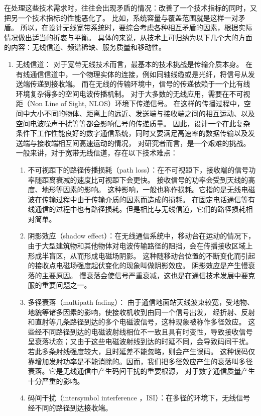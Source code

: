 在处理这些技术需求时，往往会出现矛盾的情况：改善了一个技术指标的同时，又把另一个技术指标的性能恶化了。
比如，系统容量与覆盖范围就是这样一对矛盾。
所以，在设计无线宽带系统时，要综合考虑各种相互矛盾的因素，根据实际情况做出适当的折衷与平衡。
具体的来说，从技术上可归纳为以下几个大的方面的内容：无线信道、频谱稀缺、服务质量和移动性。
\begin{enumerate}[1)]
    \item {无线信道：}
对于宽带无线技术而言，最基本的技术挑战是传输介质本身。
在有线通信信道中，一个物理实体的连接，例如同轴线缆或是光纤，将信号从发送端传递到接收端。
而在无线的传输环境中，信号的传递依赖于一个比有线环境复杂得多的空间电波传播机制。
对于大多数的无线应用，需要在不可视距（Non Line of Sight, NLOS）环境下传递信号。
在这样的传播过程中，空间中大小不同的物体、距离上的远近、发送端与接收端之间的相互运动、以及空间电波噪声干扰等等都会影响信号的传递质量。
因此，设计一个在此复杂条件下工作性能良好的数字通信系统，同时又要满足高速率的数据传输以及发送端与接收端相互间高速运动的情况，
对研究者而言，是一个艰难的挑战。
一般来讲，对于宽带无线信道，存在以下技术难点：
\begin{enumerate}[(1)]
\item 不可视距下的路径传播损耗（path loss）：在不可视距下，接收端的信号功率随距离衰减的速度比可视距下会更快。
接收信号的功率会受到天线的高度、地形等因素的影响。
这种影响，一般也称作损耗。它指的是无线电磁波在传输过程中由于传输介质的因素而造成的损耗。
在固定电话通信等有线通信的过程中也有路径损耗。但是相比与无线信道，它们的路径损耗相对简单。
\item 阴影效应（shadow effect）：在无线通信系统中，移动台在运动的情况下，由于大型建筑物和其他物体对电波传输路径的阻挡，会在传播接收区域上形成半盲区，从而形成电磁场阴影。
这种随移动台位置的不断变化而引起的接收点电磁场强度起伏变化的现象叫做阴影效应。
阴影效应是产生慢衰落的主要原因。
慢衰落会使信号严重衰减，这也是在通信技术发展中要克服的重要问题之一。
\item 多径衰落（multipath fading）： 由于通信地面站天线波束较宽，受地物、地貌等诸多因素的影响，使接收机收到由同一个信号出发，
    经折射、反射和直射等几条路径到达的多个电磁波信号，这种现象被称作多径效应。
这些经不同路径到达的电磁波射线相位不一致且具有时变性，导致接收信号呈衰落状态；又由于这些电磁波射线到达的时延不同，会导致码间干扰。
若此多条射线强度较大，且时延差不能忽略，则会产生误码。
这种误码仅靠增加发射功率是不能消除的。因而，我们把多径效应产生的衰落叫多径衰落。它是无线通信中产生码间干扰的重要根源，
对于数字通信质量产生十分严重的影响。
\item 码间干扰（intersymbol interference ，ISI）：在多径的环境下，无线信号经不同的路径到达接收端。

\end{enumerate}
\end{enumerate}
